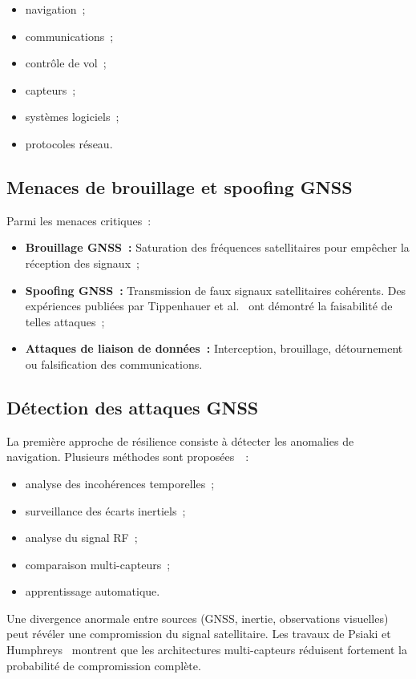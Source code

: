 \documentclass[12pt, a4paper, twoside, openright]{report}
\begin{document}
\begin{itemize}
    \item navigation~;
    \item communications~;
    \item contrôle de vol~;
    \item capteurs~;
    \item systèmes logiciels~;
    \item protocoles réseau.
\end{itemize}

\subsection{Menaces de brouillage et spoofing GNSS}

Parmi les menaces critiques~:

\begin{itemize}
    \item \textbf{Brouillage GNSS~:} Saturation des fréquences satellitaires pour empêcher la réception des signaux~;
    \item \textbf{Spoofing GNSS~:} Transmission de faux signaux satellitaires cohérents. Des expériences publiées par Tippenhauer et al.~\cite{tippenhauer2015gnss} ont démontré la faisabilité de telles attaques~;
    \item \textbf{Attaques de liaison de données~:} Interception, brouillage, détournement ou falsification des communications.
\end{itemize}

\subsection{Détection des attaques GNSS}

La première approche de résilience consiste à détecter les anomalies de navigation. Plusieurs méthodes sont proposées~\cite{mdpi2022gnss}~:

\begin{itemize}
    \item analyse des incohérences temporelles~;
    \item surveillance des écarts inertiels~;
    \item analyse du signal RF~;
    \item comparaison multi-capteurs~;
    \item apprentissage automatique.
\end{itemize}

Une divergence anormale entre sources (GNSS, inertie, observations visuelles) peut révéler une compromission du signal satellitaire. Les travaux de Psiaki et Humphreys~\cite{psiaki2016gnss} montrent que les architectures multi-capteurs réduisent fortement la probabilité de compromission complète.
\end{document}
